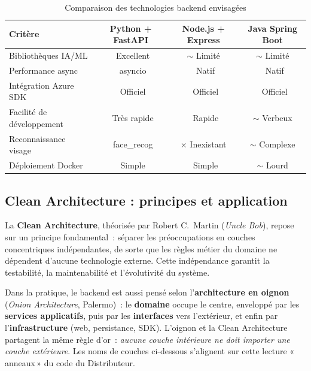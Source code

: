 \documentclass[a4paper,12pt]{report}
\begin{document}
	\begin{table}[htbp]
		\centering
		\caption{Comparaison des technologies backend envisagées}
		\label{tab:backend_comparison}
		\renewcommand{\arraystretch}{1.3}
		\begin{tabular}{|l|c|c|c|}
			\hline
			\textbf{Critère} &
			\textbf{Python + FastAPI} &
			\textbf{Node.js + Express} &
			\textbf{Java Spring Boot} \\
			\hline
			Bibliothèques IA/ML        & \checkmark\ Excellent   & $\sim$ Limité   & $\sim$ Limité   \\
			Performance async          & \checkmark\ asyncio     & \checkmark\ Natif & \checkmark\ Natif \\
			Intégration Azure SDK      & \checkmark\ Officiel    & \checkmark\ Officiel & \checkmark\ Officiel \\
			Facilité de développement  & \checkmark\ Très rapide & \checkmark\ Rapide & $\sim$ Verbeux \\
			Reconnaissance visage      & \checkmark\ face\_recog & $\times$ Inexistant & $\sim$ Complexe \\
			Déploiement Docker         & \checkmark\ Simple      & \checkmark\ Simple & $\sim$ Lourd \\
			\hline
		\end{tabular}
	\end{table}
	
	\subsection{Clean Architecture : principes et application}
	
	La \textbf{Clean Architecture}, théorisée par Robert C.~Martin
	(\textit{Uncle Bob}), repose sur un principe fondamental~: séparer
	les préoccupations en couches concentriques indépendantes, de sorte
	que les règles métier du domaine ne dépendent d'aucune technologie
	externe. Cette indépendance garantit la testabilité, la
	maintenabilité et l'évolutivité du système.
	
	Dans la pratique, le backend est aussi pensé selon l'\textbf{architecture en oignon}
	(\textit{Onion Architecture}, Palermo)~: le \textbf{domaine} occupe le centre,
	enveloppé par les \textbf{services applicatifs}, puis par les \textbf{interfaces}
	vers l'extérieur, et enfin par l'\textbf{infrastructure} (web, persistance, SDK).
	L'oignon et la Clean Architecture partagent la même règle d'or~: \textit{aucune couche
	intérieure ne doit importer une couche extérieure}. Les noms de couches ci-dessous
	s'alignent sur cette lecture «\,anneaux\,» du code du Distributeur.
	
\end{document}

